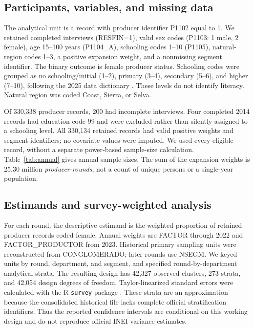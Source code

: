\documentclass[11pt,a4paper]{article}
\begin{document}
\subsection{Participants, variables, and missing data}
The analytical unit is a record with producer identifier P1102 equal to 1. We retained completed interviews (RESFIN=1), valid sex codes (P1103: 1 male, 2 female), age 15--100 years (P1104\_A), schooling codes 1--10 (P1105), natural-region codes 1--3, a positive expansion weight, and a nonmissing segment identifier. The binary outcome is female producer status. Schooling codes were grouped as no schooling/initial (1--2), primary (3--4), secondary (5--6), and higher (7--10), following the 2025 data dictionary \cite{inei2025dict}. These levels do not identify literacy. Natural region was coded Coast, Sierra, or Selva.

Of 330,338 producer records, 200 had incomplete interviews. Four completed 2014 records had education code 99 and were excluded rather than silently assigned to a schooling level. All 330,134 retained records had valid positive weights and segment identifiers; no covariate values were imputed. We used every eligible record, without a separate power-based sample-size calculation. Table~\ref{tab:annual} gives annual sample sizes. The sum of the expansion weights is 25.30 million \emph{producer-rounds}, not a count of unique persons or a single-year population.

\subsection{Estimands and survey-weighted analysis}
For each round, the descriptive estimand is the weighted proportion of retained producer records coded female. Annual weights are FACTOR through 2022 and FACTOR\_PRODUCTOR from 2023. Historical primary sampling units were reconstructed from CONGLOMERADO; later rounds use NSEGM. We keyed units by round, department, and segment, and specified round-by-department analytical strata. The resulting design has 42,327 observed clusters, 273 strata, and 42,054 design degrees of freedom. Taylor-linearized standard errors were calculated with the R \texttt{survey} package \cite{lumley2004}. These strata are an approximation because the consolidated historical file lacks complete official stratification identifiers. Thus the reported confidence intervals are conditional on this working design and do not reproduce official INEI variance estimates.
\end{document}

